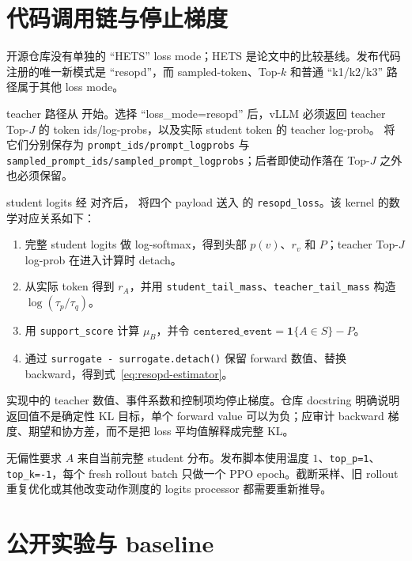 \section{代码调用链与停止梯度}

开源仓库没有单独的 ``HETS'' loss mode；HETS 是论文中的比较基线。发布代码注册的唯一新模式是 ``resopd''，而 sampled-token、Top-$k$ 和普通 ``k1/k2/k3'' 路径属于其他 loss mode。

teacher 路径从  开始。选择 ``loss\_mode=resopd'' 后，vLLM 必须返回 teacher Top-$J$ 的 token ids/log-probs，以及实际 student token 的 teacher log-prob。 将它们分别保存为
\texttt{prompt\_ids/prompt\_logprobs} 与
\texttt{sampled\_prompt\_ids/sampled\_prompt\_logprobs}；后者即使动作落在 Top-$J$ 之外也必须保留。

student logits 经  对齐后， 将四个 payload 送入  的 \texttt{resopd\_loss}。该 kernel 的数学对应关系如下：
\begin{enumerate}
\item 完整 student logits 做 log-softmax，得到头部 $p(v)$、$r_v$ 和 $P$；teacher Top-$J$ log-prob 在进入计算时 detach。
\item 从实际 token 得到 $r_A$，并用 \texttt{student\_tail\_mass}、\texttt{teacher\_tail\_mass} 构造 $\log(\tau_p/\tau_q)$。
\item 用 \texttt{support\_score} 计算 $\mu_B$，并令 $\texttt{centered\_event}=\mathbf 1\{A\in S\}-P$。
\item 通过 \texttt{surrogate - surrogate.detach()} 保留 forward 数值、替换 backward，得到式~\eqref{eq:resopd-estimator}。
\end{enumerate}
实现中的 teacher 数值、事件系数和控制项均停止梯度。仓库 docstring 明确说明返回值不是确定性 KL 目标，单个 forward value 可以为负；应审计 backward 梯度、期望和协方差，而不是把 loss 平均值解释成完整 KL。

无偏性要求 $A$ 来自当前完整 student 分布。发布脚本使用温度 $1$、\texttt{top\_p=1}、\texttt{top\_k=-1}，每个 fresh rollout batch 只做一个 PPO epoch。截断采样、旧 rollout 重复优化或其他改变动作测度的 logits processor 都需要重新推导。

\section{公开实验与 baseline}


